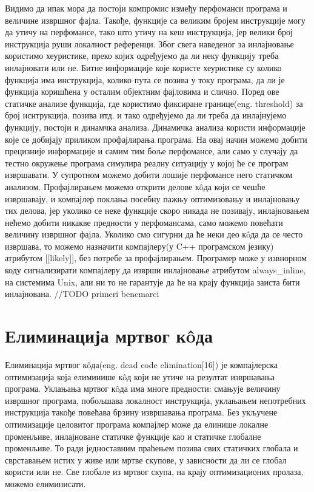 \documentclass[12pt,oneside]{memoir}
\begin{document}
Видимо да ипак мора да постоји компромис између перфоманси програма и величине
извршног фајла.
Такође, функције са великим бројем инструкције могу да утичу на перфомансе, тако
што утичу на кеш инструкција, јер велики број инструкција руши локалност референци.
Због свега наведеног за инлајновање користимо хеуристике, преко којих одређујемо
да ли неку функцију треба инлајновати или не.
Битне информације које користе хеуристике су колико функција има инструкција,
колико пута се позива у току програма, да ли је функција коришћена у осталим
објектним фајловима и слично.
Поред ове статичке анализе функција, где користимо фиксиране границе(eng. threshold)
за број иснтрукција, позива итд. и тако одређујемо да ли треба да инлајнујемо функцију,
постоји и динамчка анализа.
Динамичка анализа користи информације које се добијају приликом профајлирања програма.
На овај начин можемо добити прецизније информације и самим тим боље перфомансе,
али само у случају да тестно окружење програма симулира реалну ситуацију у којој
ће се програм извршавати.
У супротном можемо добити лошије перфомансе него статичком анализом.
Профајлирањем можемо открити делове к\^{o}да који се чешће извршавају, и компајлер 
поклања посебну пажњу оптимизовању и инлајновању тих делова, јер уколико се неке
функције скоро никада не позивају, инлајновањем нећемо добити никакве предности
у перфомансама, само можемо повећати величину извршног фајла.
Уколико смо сигурни да ће неки део к\^{o}да да се често извршава, то можемо назначити
компајлеру(у C++ програмском језику) атрибутом [[likely]], без потребе за
профајлирањем. 	
Програмер може у извнорном коду сигнализирати компајлеру да изврши инлајновање
атрибутом always{\_}inline, на системима Unix, али ни то не гарантује да ће на крају
функција заиста бити инлајнована.
//TODO primeri bencmarci


\section{Елиминација мртвог к\^{o}да}

Елиминација мртвог к\^{o}да(eng. dead code elimination[16]) је компајлерска 
оптимизација која елиминише к\^{o}д који не утиче на резултат извршавања
програма.
Уклањања мртвог к\^{o}да има многе предности: смањује величину извршног програма,
побољшава локалност инструкција, уклањањем непотребних инструкција такође
повећава брзину извршавања програма.
Без укључене оптимизације целовитог програма компајлер може да елинише локалне
променљиве, инлајноване статичке функције као и статичке глобалне променљиве.
То ради једноставним праћењем позива свих статичких глобала и сврставањем истих
у живе или мртве скупове, у зависности да ли се глобал користи или не.
Све глобале из мртвог скупа, на крају оптимизационих пролаза, можемо елиминисати.
\end{document}
